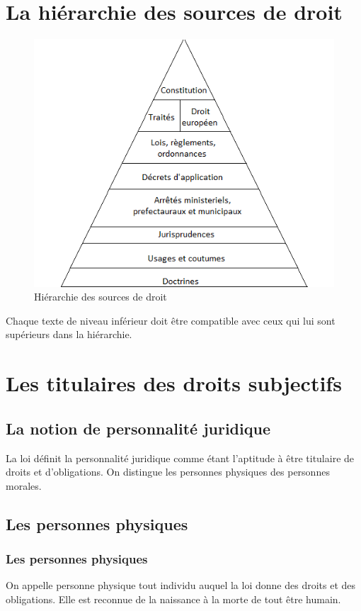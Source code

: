 \documentclass[11pt]{article}
\begin{document}
	\section{La hiérarchie des sources de droit}
		\begin{figure}[h!]
			\begin{center}
				\includegraphics{images/HierarchieSourcesDroit.png}
				\caption{Hiérarchie des sources de droit}
			\end{center}
		\end{figure}
		
		Chaque texte de niveau inférieur doit être compatible avec ceux qui lui sont supérieurs dans la hiérarchie.
		
	\section{Les titulaires des droits subjectifs}
		\subsection{La notion de personnalité juridique}
			La loi définit la personnalité juridique comme étant l'aptitude à être titulaire de droits et d'obligations. On distingue les personnes physiques des personnes morales.
			
		\subsection{Les personnes physiques}
			\subsubsection{Les personnes physiques}
				On appelle personne physique tout individu auquel la loi donne des droits et des obligations. Elle est reconnue de la naissance à la morte de tout être humain.
				
\end{document}
